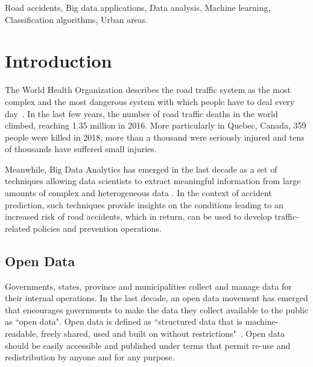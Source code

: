 \documentclass[conference]{IEEEtran}
\begin{document}
\begin{IEEEkeywords}
Road accidents, Big data applications, Data analysis, Machine learning, Classification algorithms, Urban areas. 
\end{IEEEkeywords}


\section{Introduction}

The World Health Organization describes the road traffic system as the most
complex and the most dangerous system with which people have to deal every
day~\cite{Peden2004}. In the last few years, the number of road traffic deaths in the world climbed, reaching 1.35 million in 2016\cite{road_safety_report}. More particularly in Quebec, Canada, 359 people were killed in 2018, more than a thousand were seriously injured and tens of thousands have suffered small injuries\cite{saaq}.

Meanwhile, Big Data Analytics has emerged in the last decade as a set of techniques allowing data scientists to extract meaningful information from large amounts of complex and heterogeneous data \cite{Gandomi2015}. In the context of accident prediction, such techniques provide insights on the conditions leading to an increased risk of road accidents, which in return, can be used to develop traffic-related policies and prevention operations. 


\subsection{Open Data}

Governments, states, province and municipalities collect and manage data for their internal operations. In the last decade, an open data movement has emerged that encourages governments to make the data they collect available to the public as ``open data".
Open data is defined as ``structured data that is machine-readable, freely shared, used and built on without restrictions"~\cite{opendata101}. Open data should be easily accessible and published under terms that permit re-use and redistribution by anyone and for any purpose.
\end{document}
